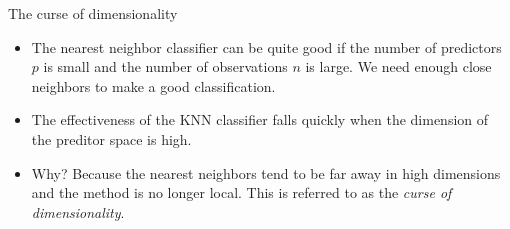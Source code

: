 \documentclass[10pt,ignorenonframetext,]{beamer}
\providecommand{\tightlist}{%
  \setlength{\itemsep}{0pt}\setlength{\parskip}{0pt}}
\begin{document}
\begin{frame}

\begin{block}{The curse of dimensionality}

\vspace{2mm}

\begin{itemize}
\tightlist
\item
  The nearest neighbor classifier can be quite good if the number of
  predictors \(p\) is small and the number of observations \(n\) is
  large. We need enough close neighbors to make a good classification.
\end{itemize}

\vspace{1mm}

\begin{itemize}
\tightlist
\item
  The effectiveness of the KNN classifier falls quickly when the
  dimension of the preditor space is high.
\end{itemize}

\vspace{1mm}

\begin{itemize}
\tightlist
\item
  Why? Because the nearest neighbors tend to be far away in high
  dimensions and the method is no longer local. This is referred to as
  the \emph{curse of dimensionality}.
\end{itemize}

\end{block}

\end{frame}
\end{document}

